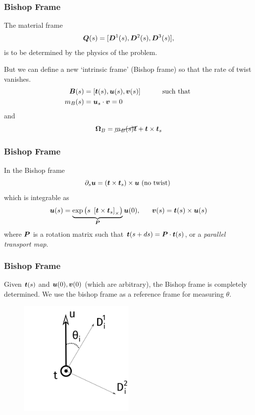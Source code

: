 \documentclass{beamer}
\begin{document}
\begin{frame}
\frametitle{Bishop Frame}

The material frame 
\[
\boldsymbol{Q}(s) = [\boldsymbol{D}^{1}(s), \boldsymbol{D}^{2}(s), \boldsymbol{D}^{3}(s)],
\]
is to be determined by the physics of the problem. 

But we can define a new `intrinsic frame' (Bishop frame) so that the rate of twist vanishes.
\begin{align}
\boldsymbol{B}(s) &= [\boldsymbol{t}(s), \boldsymbol{u}(s), \boldsymbol{v}(s)] \hspace{1cm} \text{   such that   } \\
m_{B}(s) &= \boldsymbol{u}_{s} \cdot \boldsymbol{v} = 0
\end{align}
and
\[
\boldsymbol{\Omega}_{B} = \cancel{m_B(s) \boldsymbol{t}} + \boldsymbol{t} \times  \boldsymbol{t}_{s}
\]
\end{frame} 
  
\begin{frame}
\frametitle{Bishop Frame}
In the Bishop frame 
\[
\partial_{s} \boldsymbol{u} = \left(\boldsymbol{t} \times \boldsymbol{t}_s \right) \times \boldsymbol{u} \text{   (no twist)   }
\] 
which is integrable as
\[
\V{u}(s) = \underbrace{\exp \left( s \ \left[ \V{t} \times \V{t}_s \right]_{\times} \right)}_{\M{P}}  \V{u}(0), \ \ \ \ \  \V{v}(s) = \V{t}(s) \times \V{u}(s)
\] 
where $\boldsymbol{P}$ is a rotation matrix such that $\boldsymbol{t}(s + ds) =  \boldsymbol{P} \cdot \boldsymbol{t}(s)$, or a \emph{parallel transport map}.
\end{frame} 

\begin{frame}
\frametitle{Bishop Frame}
Given $\boldsymbol{t}(s)$ and $\boldsymbol{u}(0),\boldsymbol{v}(0)$ (which are arbitrary), the Bishop frame is completely determined. We use the bishop frame as a reference frame for measuring $\theta$.
\begin{figure}
\includegraphics[height=0.6\textheight,width=0.5\textwidth]{./Cartoons/Bishop.pdf}
\end{figure}
\end{frame} 
\end{document}
